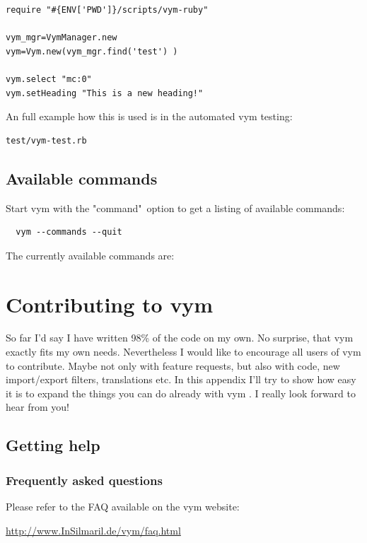 \documentclass[12pt,a4paper]{article}
\newcommand{\vym}{{\sc vym }}
\begin{document}
\begin{appendix}
\begin{verbatim}
require "#{ENV['PWD']}/scripts/vym-ruby"

vym_mgr=VymManager.new
vym=Vym.new(vym_mgr.find('test') )

vym.select "mc:0"
vym.setHeading "This is a new heading!"
\end{verbatim}

An full example how this is
used is in the automated \vym testing:
\begin{verbatim}
test/vym-test.rb
\end{verbatim}

\subsection{Available commands}
Start vym with the "command"\ option to get a listing of available
commands:
\begin{verbatim}
  vym --commands --quit
\end{verbatim}
The currently available commands are:
\begin{itemize}
    
\end{itemize}



\section{Contributing to \vym}
So far I'd say I have written 98\% of the code on my own. No surprise,
that \vym exactly fits my own needs. Nevertheless I would like to
encourage all users of  \vym to contribute. Maybe not only with feature
requests, but also with code, new import/export filters, translations
etc. In this appendix I'll try to show how easy it is to expand the
things you can do already with \vym. I really look forward to hear from
you!

\subsection{Getting help}

\subsubsection*{Frequently asked questions}
Please refer to the FAQ available on the \vym website:
\begin{center}
\href{http://www.InSilmaril.de/vym/faq.html}{http://www.InSilmaril.de/vym/faq.html}
\end{center}


\end{appendix}
\end{document}

